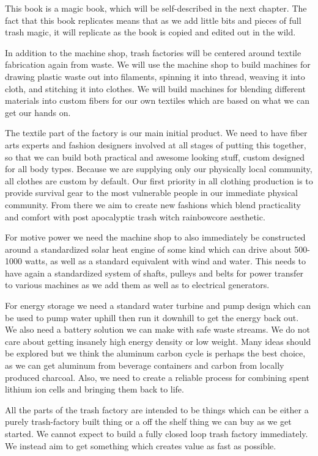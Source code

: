 \documentclass{report}
\begin{document}
This book is a magic book, which will be self-described in the next chapter.  The fact that this book replicates means that as we add little bits and pieces of full trash magic, it will replicate as the book is copied and edited out in the wild.  

In addition to the machine shop, trash factories will be centered around textile fabrication again from waste.  We will use the machine shop to build machines for drawing plastic waste out into filaments, spinning it into thread, weaving it into cloth, and stitching it into clothes.  We will build machines for blending different materials into custom fibers for our own textiles which are based on what we can get our hands on. 

The textile part of the factory is our main initial product.  We need to have fiber arts experts and fashion designers involved at all stages of putting this together, so that we can build both practical and awesome looking stuff, custom designed for all body types.  Because we are supplying only our physically local community, all clothes are custom by default.  Our first priority in all clothing production is to provide survival gear to the most vulnerable people in our immediate physical community. From there we aim to create new fashions which blend practicality and comfort with post apocalyptic trash witch rainbowcore aesthetic.

For motive power we need the machine shop to also immediately be constructed around a standardized solar heat engine of some kind which can drive about 500-1000 watts, as well as a standard equivalent with wind and water.  This needs to have again a standardized system of shafts, pulleys and belts for power transfer to various machines as we add them as well as to electrical generators.  

For energy storage we need a standard water turbine and pump design which can be used to pump water uphill then run it downhill to get the energy back out.  We also need a battery solution we can make with safe waste streams.  We do not care about getting insanely high energy density or low weight.  Many ideas should be explored but we think the aluminum carbon cycle is perhaps the best choice, as we can get aluminum from beverage containers and carbon from locally produced charcoal.  Also, we need to create a reliable process for combining spent lithium ion cells and bringing them back to life.  

All the parts of the trash factory are intended to be things which can be either a purely trash-factory built thing or a off the shelf thing we can buy as we get started.  We cannot expect to build a fully closed loop trash factory immediately.  We instead aim to get something which creates value as fast as possible. 
\end{document}

